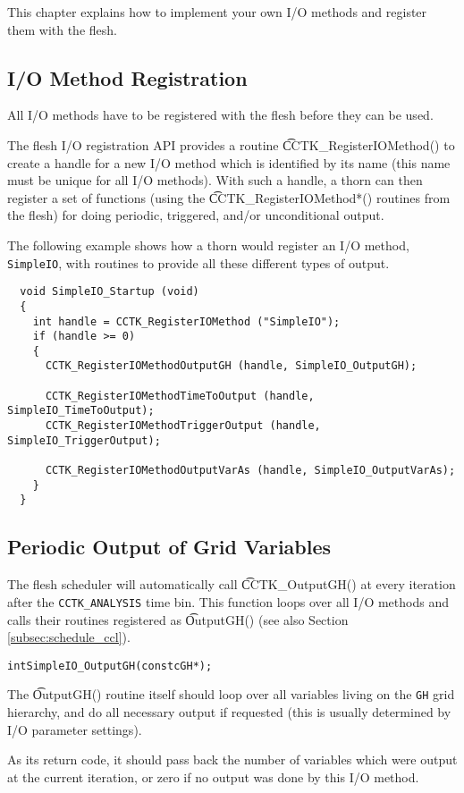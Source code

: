 This chapter explains how to implement your own I/O methods and register
them with the flesh.
%
\subsection{I/O Method Registration}
%
All I/O methods have to be registered with the flesh before they can be used.

The flesh I/O registration API provides a routine {\t CCTK\_RegisterIOMethod()}
to create a handle for a new I/O method which is identified by its name
(this name must be unique for all I/O methods).
With such a handle, a thorn can then register a set of functions (using the
{\t CCTK\_RegisterIOMethod*()} routines from the flesh) for doing
periodic, triggered, and/or unconditional output.

The following example shows how a thorn would register an I/O method,
{\tt SimpleIO}, with routines to provide all these different types of output.
%
\begin{verbatim}
  void SimpleIO_Startup (void)
  {
    int handle = CCTK_RegisterIOMethod ("SimpleIO");
    if (handle >= 0)
    {
      CCTK_RegisterIOMethodOutputGH (handle, SimpleIO_OutputGH);

      CCTK_RegisterIOMethodTimeToOutput (handle, SimpleIO_TimeToOutput);
      CCTK_RegisterIOMethodTriggerOutput (handle, SimpleIO_TriggerOutput);

      CCTK_RegisterIOMethodOutputVarAs (handle, SimpleIO_OutputVarAs);
    }
  }
\end{verbatim}
%
%
\subsection{Periodic Output of Grid Variables}
%
The flesh scheduler will automatically call {\t CCTK\_OutputGH()} at every
iteration after the {\tt CCTK\_ANALYSIS} time bin. This function loops over all
I/O methods and calls their routines registered as {\t OutputGH()} (see also Section
\ref{subsec:schedule_ccl}).
%
\begin{alltt}
  int SimpleIO_OutputGH (const cGH *);
\end{alltt}
%
The {\t OutputGH()} routine itself should loop over all variables living on the
\texttt{GH} grid hierarchy, and do all necessary output if requested
(this is usually determined by I/O parameter settings).

As its return code, it should pass back the number of variables which were output
at the current iteration, or zero if no output was done by this I/O method.
%
%
